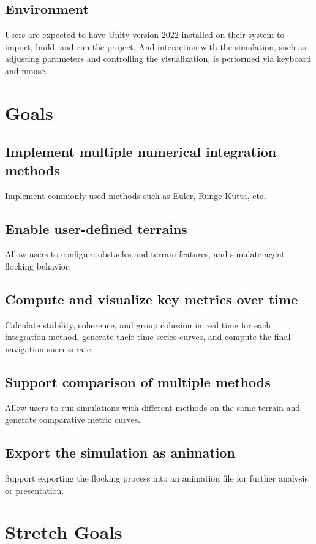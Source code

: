 \documentclass{article}
\begin{document}
\subsection{Environment}

Users are expected to have Unity version 2022 installed on their system to import, build, and run the project. And 
interaction with the simulation, such as adjusting parameters and controlling the visualization, is performed via 
keyboard and mouse.


\section{Goals}

\subsection{Implement multiple numerical integration methods}
Implement commonly used methods such as Euler, Runge-Kutta, etc.

\subsection{Enable user-defined terrains}
Allow users to configure obstacles and terrain features, and simulate agent flocking behavior.

\subsection{Compute and visualize key metrics over time}
Calculate stability, coherence, and group cohesion in real time for each integration method, generate their time-series curves, 
and compute the final navigation success rate.

\subsection{Support comparison of multiple methods}
Allow users to run simulations with different methods on the same terrain and generate comparative metric curves.

\subsection{Export the simulation as animation}
Support exporting the flocking process into an animation file for further analysis or presentation.


\section{Stretch Goals}
\end{document}
